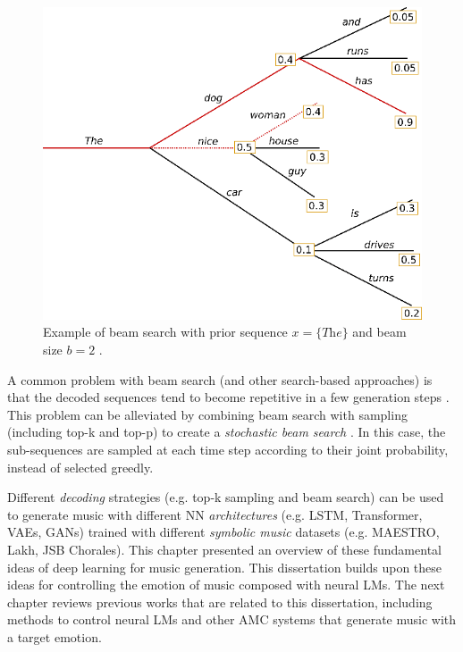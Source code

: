 \begin{figure}[!h]
 \centering
 \includegraphics[width=0.7\columnwidth]{imgs/background/beam.png}
 \caption{Example of beam search with prior sequence $x = \{\textit{The}\}$ and
 beam size $b=2$ \cite{platen2020}.}
 \label{fig:beam}
\end{figure}

A common problem with beam search (and other search-based approaches) is that the decoded sequences tend to become repetitive in a few generation steps \cite{holtzman2019curious}. This problem can be alleviated by combining beam search with sampling (including top-k and top-p) to create a \textit{stochastic beam search} \cite{poole2010artificial}. In this case, the sub-sequences are sampled at each time step according to their joint probability, instead of selected greedly.

Different \textit{decoding} strategies (e.g. top-k sampling and beam search) can be used to generate music with different NN \textit{architectures} (e.g. LSTM, Transformer, VAEs, GANs) trained with different \textit{symbolic music} datasets (e.g. MAESTRO, Lakh, JSB Chorales). This chapter presented an overview of these fundamental ideas of deep learning for music generation. This dissertation builds upon these ideas for controlling the emotion of music composed with neural LMs. The next chapter reviews previous works that are related to this dissertation, including methods to control neural LMs and other AMC systems that generate music with a target emotion.
